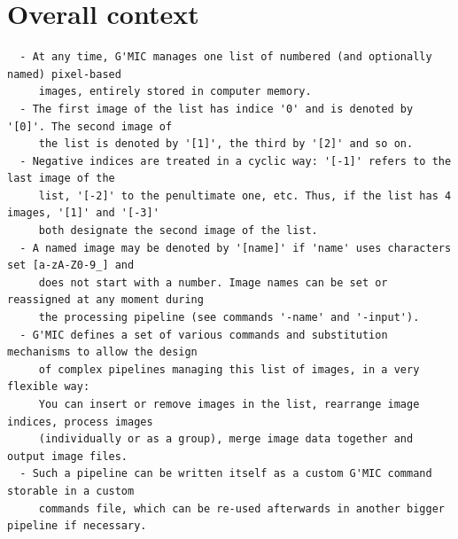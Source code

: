 \documentclass[a4paper,11pt,twoside]{book}
\begin{document}
\section{Overall context}
\small
\begin{lstlisting}
  - At any time, G'MIC manages one list of numbered (and optionally named) pixel-based 
     images, entirely stored in computer memory. 
  - The first image of the list has indice '0' and is denoted by '[0]'. The second image of 
     the list is denoted by '[1]', the third by '[2]' and so on. 
  - Negative indices are treated in a cyclic way: '[-1]' refers to the last image of the 
     list, '[-2]' to the penultimate one, etc. Thus, if the list has 4 images, '[1]' and '[-3]' 
     both designate the second image of the list. 
  - A named image may be denoted by '[name]' if 'name' uses characters set [a-zA-Z0-9_] and 
     does not start with a number. Image names can be set or reassigned at any moment during 
     the processing pipeline (see commands '-name' and '-input'). 
  - G'MIC defines a set of various commands and substitution mechanisms to allow the design 
     of complex pipelines managing this list of images, in a very flexible way: 
     You can insert or remove images in the list, rearrange image indices, process images 
     (individually or as a group), merge image data together and output image files. 
  - Such a pipeline can be written itself as a custom G'MIC command storable in a custom 
     commands file, which can be re-used afterwards in another bigger pipeline if necessary.
\end{lstlisting}
\normalsize
\end{document}
